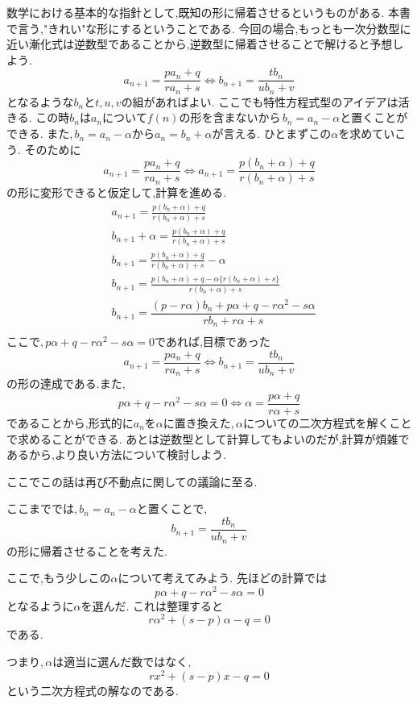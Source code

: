     数学における基本的な指針として,既知の形に帰着させるというものがある.
    本書で言う,"きれい"な形にするということである.
    今回の場合,もっとも一次分数型に近い漸化式は逆数型であることから,逆数型に帰着させることで解けると予想しよう.
    \[
      a_{n+1}=\frac{pa_n+q}{ra_n+s} \Leftrightarrow b_{n+1}=\frac{tb_n}{u b_n+v} 
    \]
    となるような$b_n$と$t,u,v$の組があればよい.
    ここでも特性方程式型のアイデアは活きる.
    この時$b_n$は$a_n$について$f(n)$の形を含まないから\,$b_n=a_n-\alpha$と置くことができる. 
    また,\,$b_n=a_n-\alpha$から$a_n=b_n+\alpha$が言える.
    ひとまずこの$\alpha$を求めていこう.
    そのために
    \[
      a_{n+1}=\frac{pa_n+q}{ra_n+s} \Leftrightarrow a_{n+1}=\frac{p(b_n+\alpha)+q}{r(b_n+\alpha)+s}
    \]
    の形に変形できると仮定して,計算を進める.
    \begin{align*}
      &a_{n+1}=\frac{p(b_n+\alpha)+q}{r(b_n+\alpha)+s}\\
      &b_{n+1}+\alpha=\frac{p(b_n+\alpha)+q}{r(b_n+\alpha)+s}\\
      &b_{n+1}=\frac{p(b_n+\alpha)+q}{r(b_n+\alpha)+s}-\alpha\\
      &b_{n+1}=\frac{p(b_n+\alpha)+q-\alpha\{r(b_n+\alpha)+s\}}{r(b_n+\alpha)+s}\\
      &b_{n+1}=\dfrac{(p-r\alpha)b_{n}+p\alpha+q-r\alpha^{2}-s\alpha}{rb_{n}+r\alpha+s}\\
    \end{align*}
    ここで,\,$p\alpha+q-r\alpha^{2}-s\alpha=0$であれば,目標であった
    \[
      a_{n+1}=\frac{pa_n+q}{ra_n+s} \Leftrightarrow b_{n+1}=\frac{tb_n}{u b_n+v} 
    \]
    の形の達成である.また,
    \[
      p\alpha+q-r\alpha^{2}-s\alpha=0 \Leftrightarrow \alpha=\frac{p\alpha+q}{r\alpha+s}
    \]
    であることから,形式的に$a_n$を$\alpha$に置き換えた,\,$\alpha$についての二次方程式を解くことで求めることができる.
    あとは逆数型として計算してもよいのだが,計算が煩雑であるから,より良い方法について検討しよう.

    ここでこの話は再び不動点に関しての議論に至る.

    ここまででは,\,$b_n=a_n-\alpha$と置くことで,
    \[
      b_{n+1}=\frac{tb_n}{ub_n+v}
    \]
    の形に帰着させることを考えた.
    
    ここで,もう少しこの$\alpha$について考えてみよう.
    先ほどの計算では
    \[
      p\alpha+q-r\alpha^2-s\alpha=0
    \]
    となるように$\alpha$を選んだ.
    これは整理すると
    \[
      r\alpha^2+(s-p)\alpha-q=0
    \]
    である.
    
    つまり,\,$\alpha$は適当に選んだ数ではなく,
    \[
      rx^2+(s-p)x-q=0
    \]
    という二次方程式の解なのである.
    
